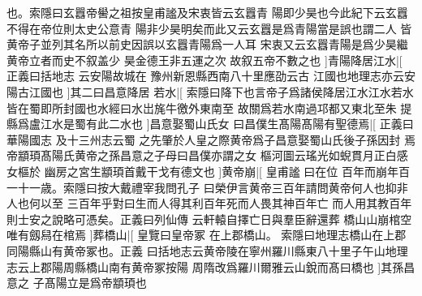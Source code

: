 也。索隱曰玄囂帝嚳之祖按皇甫謐及宋衷皆云玄囂青%
%
陽即少昊也今此紀下云玄囂不得在帝位則太史公意青%
陽非少昊明矣而此又云玄囂是爲青陽當是誤也謂二人%
%
皆黄帝子並列其名所以前史因誤以玄囂青陽爲一人耳%
宋衷又云玄囂青陽是爲少昊繼黄帝立者而史不叙盖少%
%
昊金德王非五運之次%
故叙五帝不數之也%
]青陽降居江水|[%
正義曰括地志%
云安陽故城在%
%
豫州新恩縣西南八十里應劭云古%
江國也地理志亦云安陽古江國也%
]其二曰昌意降居%
%
若水|[%
索隱曰降下也言帝子爲諸侯降居江水江水若水%
皆在蜀即所封國也水經曰水岀旄牛徼外東南至%
%
故關爲若水南過邛都又東北至朱%
提縣爲盧江水是蜀有此二水也%
]昌意娶蜀山氏女%
%
曰昌僕生髙陽髙陽有聖德焉|[%
正義曰華陽國志%
及十三州志云蜀%
%
之先肇於人皇之際黄帝爲子昌意娶蜀山氏後子孫因封%
焉帝顓頊髙陽氏黄帝之孫昌意之子母曰昌僕亦謂之女%
%
樞河圖云瑤光如蜺貫月正白感女樞於%
幽房之宮生顓頊首戴干戈有德文也%
]黄帝崩|[%
皇甫謐%
曰在位%
%
百年而崩年百一十一歳。索隱曰按大戴禮宰我問孔子%
曰榮伊言黄帝三百年請問黄帝何人也抑非人也何以至%
%
三百年乎對曰生而人得其利百年死而人畏其神百年亡%
而人用其教百年則士安之說略可憑矣。正義曰列仙傳%
%
云軒轅自擇亡日與羣臣辭還葬%
橋山山崩棺空唯有劔舄在棺焉%
]葬橋山|[%
皇覽曰皇帝冢%
在上郡橋山。%
%
索隱曰地理志橋山在上郡同陽縣山有黄帝冢也。正義%
曰括地志云黄帝陵在寧州羅川縣東八十里子午山地理%
%
志云上郡陽周縣橋山南有黄帝冢按陽%
周隋改爲羅川爾雅云山銳而髙曰橋也%
]其孫昌意之%
%
子髙陽立是爲帝顓頊也%
